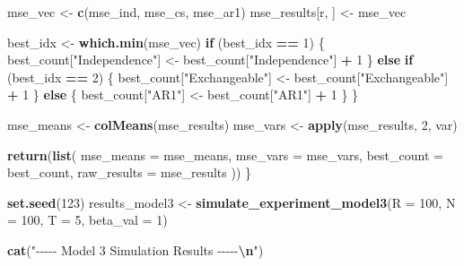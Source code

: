 \documentclass[
]{article}
\newenvironment{Shaded}{\begin{snugshade}}{\end{snugshade}}
\newcommand{\AttributeTok}[1]{\textcolor[rgb]{0.13,0.29,0.53}{#1}}
\newcommand{\ControlFlowTok}[1]{\textcolor[rgb]{0.13,0.29,0.53}{\textbf{#1}}}
\newcommand{\DecValTok}[1]{\textcolor[rgb]{0.00,0.00,0.81}{#1}}
\newcommand{\FunctionTok}[1]{\textcolor[rgb]{0.13,0.29,0.53}{\textbf{#1}}}
\newcommand{\NormalTok}[1]{#1}
\newcommand{\OtherTok}[1]{\textcolor[rgb]{0.56,0.35,0.01}{#1}}
\newcommand{\SpecialCharTok}[1]{\textcolor[rgb]{0.81,0.36,0.00}{\textbf{#1}}}
\newcommand{\StringTok}[1]{\textcolor[rgb]{0.31,0.60,0.02}{#1}}
\begin{document}
\begin{Shaded}
\begin{Highlighting}[]
\NormalTok{    mse\_vec }\OtherTok{\textless{}{-}} \FunctionTok{c}\NormalTok{(mse\_ind, mse\_cs, mse\_ar1)}
\NormalTok{    mse\_results[r, ] }\OtherTok{\textless{}{-}}\NormalTok{ mse\_vec}
    
\NormalTok{    best\_idx }\OtherTok{\textless{}{-}} \FunctionTok{which.min}\NormalTok{(mse\_vec)}
    \ControlFlowTok{if}\NormalTok{ (best\_idx }\SpecialCharTok{==} \DecValTok{1}\NormalTok{) \{}
\NormalTok{      best\_count[}\StringTok{"Independence"}\NormalTok{] }\OtherTok{\textless{}{-}}\NormalTok{ best\_count[}\StringTok{"Independence"}\NormalTok{] }\SpecialCharTok{+} \DecValTok{1}
\NormalTok{    \} }\ControlFlowTok{else} \ControlFlowTok{if}\NormalTok{ (best\_idx }\SpecialCharTok{==} \DecValTok{2}\NormalTok{) \{}
\NormalTok{      best\_count[}\StringTok{"Exchangeable"}\NormalTok{] }\OtherTok{\textless{}{-}}\NormalTok{ best\_count[}\StringTok{"Exchangeable"}\NormalTok{] }\SpecialCharTok{+} \DecValTok{1}
\NormalTok{    \} }\ControlFlowTok{else}\NormalTok{ \{}
\NormalTok{      best\_count[}\StringTok{"AR1"}\NormalTok{] }\OtherTok{\textless{}{-}}\NormalTok{ best\_count[}\StringTok{"AR1"}\NormalTok{] }\SpecialCharTok{+} \DecValTok{1}
\NormalTok{    \}}
\NormalTok{  \}}
  
\NormalTok{  mse\_means }\OtherTok{\textless{}{-}} \FunctionTok{colMeans}\NormalTok{(mse\_results)}
\NormalTok{  mse\_vars  }\OtherTok{\textless{}{-}} \FunctionTok{apply}\NormalTok{(mse\_results, }\DecValTok{2}\NormalTok{, var)}
  
  \FunctionTok{return}\NormalTok{(}\FunctionTok{list}\NormalTok{(}
    \AttributeTok{mse\_means =}\NormalTok{ mse\_means,}
    \AttributeTok{mse\_vars =}\NormalTok{ mse\_vars,}
    \AttributeTok{best\_count =}\NormalTok{ best\_count,}
    \AttributeTok{raw\_results =}\NormalTok{ mse\_results}
\NormalTok{  ))}
\NormalTok{\}}

\FunctionTok{set.seed}\NormalTok{(}\DecValTok{123}\NormalTok{)}
\NormalTok{results\_model3 }\OtherTok{\textless{}{-}} \FunctionTok{simulate\_experiment\_model3}\NormalTok{(}\AttributeTok{R =} \DecValTok{100}\NormalTok{, }\AttributeTok{N =} \DecValTok{100}\NormalTok{, }\AttributeTok{T =} \DecValTok{5}\NormalTok{, }\AttributeTok{beta\_val =} \DecValTok{1}\NormalTok{)}

\FunctionTok{cat}\NormalTok{(}\StringTok{"{-}{-}{-}{-}{-} Model 3 Simulation Results {-}{-}{-}{-}{-}}\SpecialCharTok{\textbackslash{}n}\StringTok{"}\NormalTok{)}
\end{Highlighting}
\end{Shaded}
\end{document}

